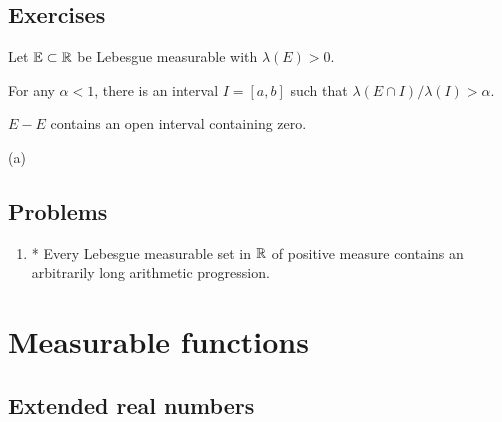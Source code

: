 \documentclass{../note}
\begin{document}
\begin{prb}
\end{prb}

\begin{prb}
\end{prb}

\begin{prb}
\end{prb}


\section*{Exercises}

\begin{prb}
Let $\mathbb{E}\subset\mathbb{R}$ be Lebesgue measurable with $\lambda(E)>0$.
\begin{parts}
\item For any $\alpha<1$, there is an interval $I=[a,b]$ such that $\lambda(E\cap I)/\lambda(I)>\alpha$.
\item $E-E$ contains an open interval containing zero.
\end{parts}
\begin{pf}
(a)
\end{pf}
\end{prb}




\section*{Problems}
\begin{enumerate}
\item* Every Lebesgue measurable set in $\mathbb{R}$ of positive measure contains an arbitrarily long arithmetic progression.
\end{enumerate}

















\chapter{Measurable functions}

\section{Extended real numbers}
\end{document}
